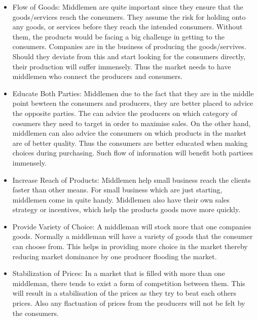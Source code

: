 \documentclass[12pt, a4]{article}
\begin{document}
\begin{itemize}
  
\item{Flow of Goods: Middlemen are quite important since they ensure that the
goods/services reach the consumers. They assume the risk for holding onto any
goods, or services before they reach the intended consumers. Without them, the
products would be facing a big challenge in getting to the consumers. Companies
are in the business of producing the goods/servives. Should they deviate from
this and start looking for the consumers directly, their production will suffer
immensely. Thus the market needs to have middlemen who connect the producers and
consumers.}

\item{Educate Both Parties: Middlemen due to the fact that they are in the middle
point bewteen the consumers and producers, they are better placed to advice the
opposite parties. The can advice the producers on which category of cosumers
they need to target in order to maximise sales. On the other hand, middlemen can
also advice the consumers on which products in the market are of better quality.
Thus the consumers are better educated when making choices during purchasing.
Such flow of information will benefit both partiees immensely.}

\item{Increase Reach of Products: Middlemen help small business reach the clients
faster than other means. For small business which are just starting, middlemen
come in quite handy. Middlemen also have their own sales strategy or incentives,
which help the products goods move more quickly.}

\item{Provide Variety of Choice: A middleman will stock more that one companies goods.
Normally a middleman will have a variety of goods that the consumer can choose
from. This helps in providing more choice in the market thereby reducing market
dominance by one producer flooding the market.}

\item{Stabilization of Prices: In a market that is filled with more than one
middleman, there tends to exist a form of competition between them. This will
result in a stabilisation of the prices as they try to beat each others prices.
Also any flactuation of prices from the producers will not be felt by the
consumers.}

\end{itemize}
\pagebreak
\end{document}
